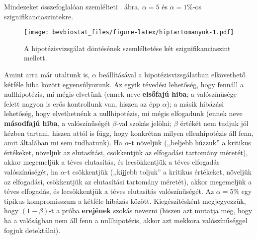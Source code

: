 \documentclass[
]{book}
\begin{document}
Mindezeket összefoglalóan szemlélteti . ábra, \(\alpha=5\) és \(\alpha=1\)\%-os szignifikanciaszintekre.

\begin{figure}
\centering
\texttt{[image: bevbiostat\_files/figure-latex/hiptartomanyok-1.pdf]}
\caption{\label{fig:hiptartomanyok}A hipotézisvizsgálat döntésének szemléltetése két szignifikanciaszint mellett.}
\end{figure}

Amint arra már utaltunk is, \(\alpha\) beállításával a hipotézisvizsgálatban elkövethető kétféle hiba között egyensúlyozunk. Az egyik tévedési lehetőség, hogy fennáll a nullhipotézis, mi mégis elvetünk (ennek neve \textbf{elsőfajú hiba}; a valószínűsége felett nagyon is erős kontrollunk van, hiszen az épp \(\alpha\)); a másik hibázási lehetőség, hogy elvethetnénk a nullhipotézis, mi mégis elfogadunk (ennek neve \textbf{másodfajú hiba}, a valószínűségét \(\beta\)-val szokás jelölni; \(\beta\) értékét nem tudjuk jól kézben tartani, hiszen attól is függ, hogy konkrétan milyen ellenhipotézis áll fenn, amit általában mi sem tudhatunk). Ha \(\alpha\)-t növeljük (,,beljebb húzzuk'' a kritikus értékeket, növeljük az elutasítási, csökkentjük az elfogadási tartomány méretét), akkor megemeljük a téves elutasítás, és lecsökkentjük a téves elfogadás valószínűségét, ha \(\alpha\)-t csökkentjük (,,kijjebb toljuk'' a kritikus értékeket, növeljük az elfogadási, csökkentjük az elutasítási tartomány méretét), akkor megemeljük a téves elfogadás, és lecsökkentjük a téves elutasítás valószínűségét. Az \(\alpha=5\)\% egy tipikus kompromisszum a kétféle hibázás között. Kiegészítésként megjegyezzük, hogy \(\left(1-\beta\right)\)-t a próba \textbf{erejének} szokás nevezni (hiszen azt mutatja meg, hogy ha a valóságban nem áll fenn a nullhipotézis, akkor azt mekkora valószínűséggel fogjuk detektálni).
\end{document}
